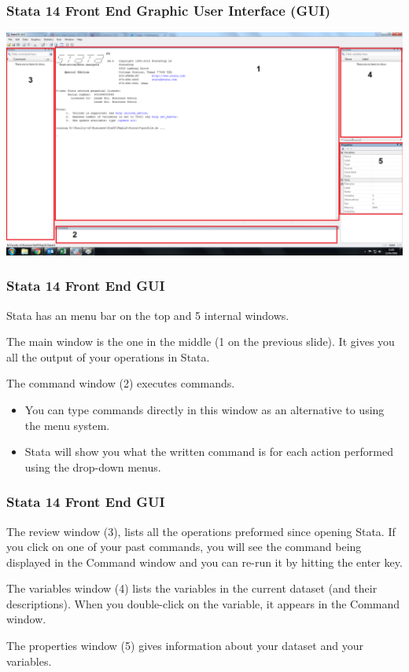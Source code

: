 \documentclass[10pt, compress]{beamer}
\begin{document}
\begin{frame}[fragile]
  \frametitle{Stata 14 Front End Graphic User Interface (GUI)}
  \includegraphics[width=\linewidth,height=\textheight,keepaspectratio]{stata.png}
\end{frame}

\begin{frame}[fragile]
  \frametitle{Stata 14 Front End GUI}
Stata has an menu bar on the top and 5 internal windows.

The \alert{main} window is the one in the middle (1 on the previous slide). It gives
you all the output of your operations in Stata.

The \alert{command window} (2) executes commands. 
\begin{itemize}
    \item You can type commands directly in this window as an alternative to using the menu system.
    \item Stata will show you what the written command is for each action performed using the drop-down menus.
\end{itemize}


\end{frame}

\begin{frame}[fragile]
  \frametitle{Stata 14 Front End GUI}
  
  The \alert{review window} (3), lists all the operations preformed since opening
Stata. If you click on one of your past commands, you will see the command
being displayed in the Command window and you can re-run it by hitting the
enter key.

The \alert{variables window} (4) lists the variables in the current dataset (and their
descriptions). When you double-click on the variable, it appears in the
Command window.

The \alert{properties window} (5) gives information about your dataset and your
variables.

\end{frame}
\end{document}
